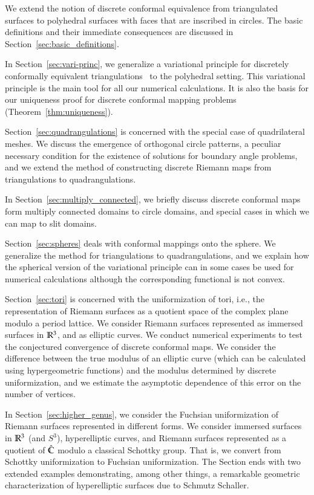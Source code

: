 \documentclass[Thesis]{subfiles}
\begin{document}
We extend the notion of discrete conformal equivalence from
triangulated surfaces to polyhedral surfaces with faces that are
inscribed in circles. The basic definitions and their immediate
consequences are discussed in Section~\ref{sec:basic_definitions}. 

In Section~\ref{sec:vari-princ}, we generalize a variational principle
for discretely conformally equivalent
triangulations~\cite{BPS2015:dconf} to the polyhedral setting. This
variational principle is the main tool for all our numerical
calculations. It is also the basis for our uniqueness proof for
discrete conformal mapping problems
(Theorem~\ref{thm:uniqueness}). 

Section~\ref{sec:quadrangulations} is concerned with the special case
of quadrilateral meshes. We discuss the emergence of
orthogonal circle patterns, a peculiar necessary condition for the
existence of solutions for boundary angle problems, and we extend the
method of constructing discrete Riemann maps from triangulations to
quadrangulations.

In Section~\ref{sec:multiply_connected}, we briefly discuss discrete
conformal maps form multiply connected domains to circle domains, and
special cases in which we can map to slit domains. 

Section~\ref{sec:spheres} deals with conformal mappings onto the
sphere. We generalize the method for triangulations to
quadrangulations, and we explain how the spherical version of the
variational principle can in some cases be used for numerical
calculations although the corresponding functional is not convex.

Section~\ref{sec:tori} is concerned with the uniformization of tori,
i.e., the representation of Riemann surfaces as a quotient space of
the complex plane modulo a period lattice. We consider Riemann
surfaces represented as immersed surfaces in $\mathbb R^{3}$, and as elliptic
curves. We conduct numerical experiments to test the conjectured
convergence of discrete conformal maps. We consider the difference
between the true modulus of an elliptic curve (which can be calculated
using hypergeometric functions) and the modulus determined by discrete
uniformization, and we estimate the asymptotic dependence of this
error on the number of vertices.

In Section~\ref{sec:higher_genus}, we consider the Fuchsian
uniformization of Riemann surfaces represented in different forms. We
consider immersed surfaces in $\mathbb R^{3}$ (and $S^{3}$), hyperelliptic
curves, and Riemann surfaces represented as a quotient of $\hat{\mathbb C}$
modulo a classical Schottky group. That is, we convert from Schottky
uniformization to Fuchsian uniformization. The Section ends with two
extended examples demonstrating, among other things, a remarkable
geometric characterization of hyperelliptic surfaces due to Schmutz
Schaller.
\end{document}
